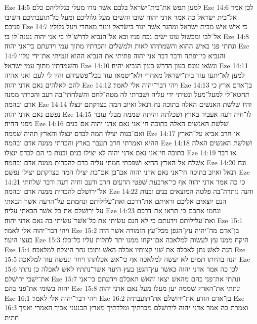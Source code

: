 Eze 14:5  למען תפשׂ את־בית־ישׂראל בלבם אשׁר נזרו מעלי בגלוליהם כלם׃
Eze 14:6  לכן אמר אל־בית ישׂראל כה אמר אדני יהוה שׁובו והשׁיבו מעל גלוליכם ומעל כל־תועבתיכם השׁיבו פניכם׃
Eze 14:7  כי אישׁ אישׁ מבית ישׂראל ומהגר אשׁר־יגור בישׂראל וינזר מאחרי ויעל גלוליו אל־לבו ומכשׁול עונו ישׂים נכח פניו ובא אל־הנביא לדרשׁ־לו בי אני יהוה נענה־לו בי׃
Eze 14:8  ונתתי פני באישׁ ההוא והשׂמתיהו לאות ולמשׁלים והכרתיו מתוך עמי וידעתם כי־אני יהוה׃
Eze 14:9  והנביא כי־יפתה ודבר דבר אני יהוה פתיתי את הנביא ההוא ונטיתי את־ידי עליו והשׁמדתיו מתוך עמי ישׂראל׃
Eze 14:10  ונשׂאו עונם כעון הדרשׁ כעון הנביא יהיה׃
Eze 14:11  למען לא־יתעו עוד בית־ישׂראל מאחרי ולא־יטמאו עוד בכל־פשׁעיהם והיו לי לעם ואני אהיה להם לאלהים נאם אדני יהוה׃
Eze 14:12  ויהי דבר־יהוה אלי לאמר׃
Eze 14:13  בן־אדם ארץ כי תחטא־לי למעל־מעל ונטיתי ידי עליה ושׁברתי לה מטה־לחם והשׁלחתי־בה רעב והכרתי ממנה אדם ובהמה׃
Eze 14:14  והיו שׁלשׁת האנשׁים האלה בתוכה נח דנאל ואיוב המה בצדקתם ינצלו נפשׁם נאם אדני יהוה׃
Eze 14:15  לו־חיה רעה אעביר בארץ ושׁכלתה והיתה שׁממה מבלי עובר מפני החיה׃
Eze 14:16  שׁלשׁת האנשׁים האלה בתוכה חי־אני נאם אדני יהוה אם־בנים ואם־בנות יצילו המה לבדם ינצלו והארץ תהיה שׁממה׃
Eze 14:17  או חרב אביא על־הארץ ההיא ואמרתי חרב תעבר בארץ והכרתי ממנה אדם ובהמה׃
Eze 14:18  ושׁלשׁת האנשׁים האלה בתוכה חי־אני נאם אדני יהוה לא יצילו בנים ובנות כי הם לבדם ינצלו׃
Eze 14:19  או דבר אשׁלח אל־הארץ ההיא ושׁפכתי חמתי עליה בדם להכרית ממנה אדם ובהמה׃
Eze 14:20  ונח דנאל ואיוב בתוכה חי־אני נאם אדני יהוה אם־בן אם־בת יצילו המה בצדקתם יצילו נפשׁם׃
Eze 14:21  כי כה אמר אדני יהוה אף כי־ארבעת שׁפטי הרעים חרב ורעב וחיה רעה ודבר שׁלחתי אל־ירושׁלם להכרית ממנה אדם ובהמה׃
Eze 14:22  והנה נותרה־בה פלטה המוצאים בנים ובנות הנם יוצאים אליכם וראיתם את־דרכם ואת־עלילותם ונחמתם על־הרעה אשׁר הבאתי על־ירושׁלם את כל־אשׁר הבאתי עליה׃
Eze 14:23  ונחמו אתכם כי־תראו את־דרכם ואת־עלילותם וידעתם כי לא חנם עשׂיתי את כל־אשׁר־עשׂיתי בה נאם אדני יהוה׃
Eze 15:1  ויהי דבר־יהוה אלי לאמר׃
Eze 15:2  בן־אדם מה־יהיה עץ־הגפן מכל־עץ הזמורה אשׁר היה בעצי היער׃
Eze 15:3  היקח ממנו עץ לעשׂות למלאכה אם־יקחו ממנו יתד לתלות עליו כל־כלי׃
Eze 15:4  הנה לאשׁ נתן לאכלה את שׁני קצותיו אכלה האשׁ ותוכו נחר היצלח למלאכה׃
Eze 15:5  הנה בהיותו תמים לא יעשׂה למלאכה אף כי־אשׁ אכלתהו ויחר ונעשׂה עוד למלאכה׃
Eze 15:6  לכן כה אמר אדני יהוה כאשׁר עץ־הגפן בעץ היער אשׁר־נתתיו לאשׁ לאכלה כן נתתי את־ישׁבי ירושׁלם׃
Eze 15:7  ונתתי את־פני בהם מהאשׁ יצאו והאשׁ תאכלם וידעתם כי־אני יהוה בשׂומי את־פני בהם׃
Eze 15:8  ונתתי את־הארץ שׁממה יען מעלו מעל נאם אדני יהוה׃
Eze 16:1  ויהי דבר־יהוה אלי לאמר׃
Eze 16:2  בן־אדם הודע את־ירושׁלם את־תועבתיה׃
Eze 16:3  ואמרת כה־אמר אדני יהוה לירושׁלם מכרתיך ומלדתיך מארץ הכנעני אביך האמרי ואמך חתית׃
